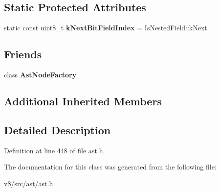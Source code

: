 \subsection*{Static Protected Attributes}
\begin{DoxyCompactItemize}
\item 
\mbox{\label{classv8_1_1internal_1_1VariableDeclaration_a29ea61bc4f689b33ad633fa56924833c}} 
static const uint8\+\_\+t {\bfseries k\+Next\+Bit\+Field\+Index} = Is\+Nested\+Field\+::k\+Next
\end{DoxyCompactItemize}
\subsection*{Friends}
\begin{DoxyCompactItemize}
\item 
\mbox{\label{classv8_1_1internal_1_1VariableDeclaration_a8d587c8ad3515ff6433eb83c578e795f}} 
class {\bfseries Ast\+Node\+Factory}
\end{DoxyCompactItemize}
\subsection*{Additional Inherited Members}


\subsection{Detailed Description}


Definition at line 448 of file ast.\+h.



The documentation for this class was generated from the following file\+:\begin{DoxyCompactItemize}
\item 
v8/src/ast/ast.\+h\end{DoxyCompactItemize}

